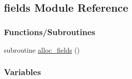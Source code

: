 \hypertarget{namespacefields}{}\subsection{fields Module Reference}
\label{namespacefields}
\subsubsection*{Functions/\+Subroutines}
\begin{DoxyCompactItemize}
\item 
subroutine \hyperlink{namespacefields_a92712559b1d862a268d6318ac9d3a743}{alloc\+\_\+fields} ()
\end{DoxyCompactItemize}
\subsubsection*{Variables}
